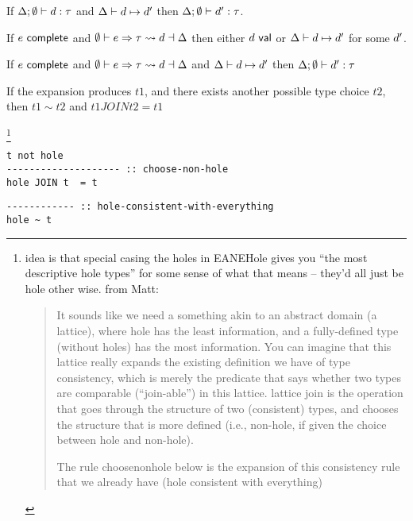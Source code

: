 \begin{theorem}[Preservation]
  If $\Delta; \emptyset \vdash d : \tau$ and
  $\Delta \vdash d \mapsto d'$ then
  $\Delta; \emptyset \vdash d' : \tau$. 
\end{theorem}

\begin{theorem}
If $e~\mathsf{complete}$ and
$\emptyset \vdash e \Rightarrow \tau \leadsto d \dashv \Delta$ then either
$d~\mathsf{val}$ or $\Delta \vdash d \mapsto d'$ for some $d'$.

\end{theorem}

\begin{theorem}
If $e~\mathsf{complete}$ and
$\emptyset \vdash e \Rightarrow \tau \leadsto d \dashv \Delta$ and
$\Delta \vdash d \mapsto d'$ then
$\Delta; \emptyset \vdash d' : \tau$
\end{theorem}

\begin{theorem}
\end{theorem}


\begin{theorem}
If the expansion produces $t1$, and there exists another possible type choice
$t2$, then $t1 \sim t2$ and $t1 JOIN t2 = t1$
\end{theorem}\footnote{idea is that special casing the holes in EANEHole gives you ``the
most descriptive hole types'' for some sense of what that means -- they'd
all just be hole other wise. from Matt:
\begin{quote}
It sounds like we need a something akin to an abstract domain (a lattice),
where hole has the least information, and a fully-defined type (without
holes) has the most information.  You can imagine that this lattice really
expands the existing definition we have of type consistency, which is
merely the predicate that says whether two types are comparable
(“join-able”) in this lattice.  lattice join is the operation that goes
through the structure of two (consistent) types, and chooses the structure
that is more defined (i.e., non-hole, if given the choice between hole and
non-hole).

The rule choosenonhole below is the expansion of this consistency rule that
we already have (hole consistent with everything)
\end{quote}}

\begin{verbatim}
t not hole
-------------------- :: choose-non-hole
hole JOIN t  = t
\end{verbatim}
\begin{verbatim}
------------ :: hole-consistent-with-everything
hole ~ t
\end{verbatim}


